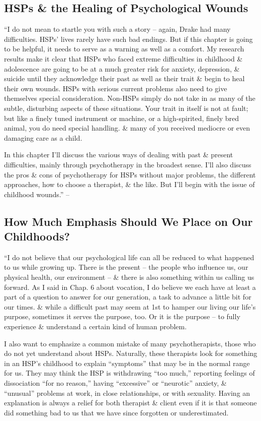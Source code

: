 \documentclass{article}
\numberwithin{equation}{section}
\begin{document}
\subsection{HSPs \& the Healing of Psychological Wounds}
``I do not mean to startle you with such a story -- again, Drake had many difficulties. HSPs' lives rarely have such bad endings. But if this chapter is going to be helpful, it needs to serve as a warning as well as a comfort. My research results make it clear that HSPs who faced extreme difficulties in childhood \& adolescence are going to be at a much greater risk for anxiety, depression, \& suicide until they acknowledge their past as well as their trait \& begin to heal their own wounds. HSPs with serious current problems also need to give themselves special consideration. Non-HSPs simply do not take in as many of the subtle, disturbing aspects of these situations. Your trait in itself is not at fault; but like a finely tuned instrument or machine, or a high-spirited, finely bred animal, you do need special handling. \& many of you received mediocre or even damaging care as a child.

In this chapter I'll discuss the various ways of dealing with past \& present difficulties, mainly through psychotherapy in the broadest sense. I'll also discuss the pros \& cons of psychotherapy for HSPs without major problems, the different approaches, how to choose a therapist, \& the like. But I'll begin with the issue of childhood wounds.'' -- \cite[p. 199]{Aron2013}

\subsection{How Much Emphasis Should We Place on Our Childhoods?}
``I do not believe that our psychological life can all be reduced to what happened to us while growing up. There is the present -- the people who influence us, our physical health, our environment -- \& there is also something within us calling us forward. As I said in Chap. 6 about vocation, I do believe we each have at least a part of a question to answer for our generation, a task to advance a little bit for our times. \& while a difficult past may seem at 1st to hamper our living our life's purpose, sometimes it serves the purpose, too. Or it is the purpose -- to fully experience \& understand a certain kind of human problem.

I also want to emphasize a common mistake of many psychotherapists, those who do not yet understand about HSPs. Naturally, these therapists look for something in an HSP's childhood to explain ``symptoms'' that may be in the normal range for us. They may think the HSP is withdrawing ``too much,'' reporting feelings of dissociation ``for no reason,'' having ``excessive'' or ``neurotic'' anxiety, \& ``unusual'' problems at work, in close relationships, or with sexuality. Having an explanation is always a relief for both therapist \& client even if it is that someone did something bad to us that we have since forgotten or underestimated.
\end{document}
